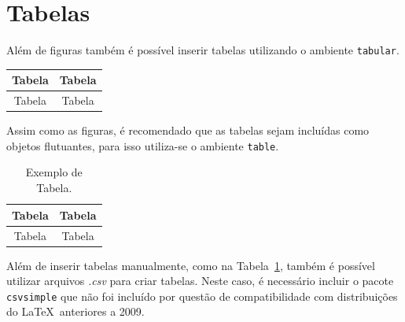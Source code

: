 \section{Tabelas}
Além de figuras também é possível inserir tabelas utilizando o ambiente
\lstinline+tabular+. \\
\begin{tabular}{cc}
  \toprule
  Tabela & Tabela \\
  \midrule
  Tabela & Tabela \\
  \bottomrule
\end{tabular}

Assim como as figuras, é recomendado que as tabelas sejam incluídas como
objetos flutuantes, para isso utiliza-se o ambiente \lstinline+table+.
\begin{table}[!htb]
  \caption{Exemplo de Tabela.}
  \label{tab:exem}
  \centering
  \begin{tabular}{cc}
    \toprule
    Tabela & Tabela \\
    \midrule
    Tabela & Tabela \\
    \bottomrule
  \end{tabular}
\end{table}

Além de inserir tabelas manualmente, como na Tabela~\ref{tab:exem}, também é
possível utilizar arquivos \emph{.csv} para criar tabelas. Neste caso, é
necessário incluir o pacote \texttt{csvsimple} que não foi incluído por questão
de compatibilidade com distribuições do \LaTeX \ anteriores a 2009.